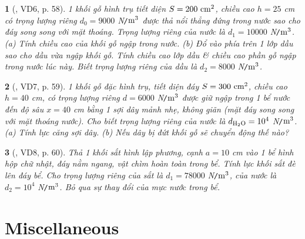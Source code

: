 \documentclass{article}
\newtheorem{baitoan}{}
\begin{document}
\begin{baitoan}[\cite{Van_Quyen_Hanh_Nhu_10_chuyen_Ly}, VD6, p. 58]
	1 khối gỗ hình trụ tiết diện $S = 200\ {\rm cm^2}$, chiều cao $h = 25$ {\rm cm} có trọng lượng riêng $d_0 = 9000$ {\rm N{\tt/}$\rm m^3$} được thả nổi thẳng đứng trong nước sao cho đáy song song với mặt thoáng. Trọng lượng riêng của nước là $d_1 = 10000$ {\rm N{\tt/}$\rm m^3$}. (a) Tính chiều cao của khối gỗ ngập trong nước. (b) Đổ vào phía trên 1 lớp dầu sao cho dầu vừa ngập khối gỗ. Tính chiều cao lớp dầu \& chiều cao phần gỗ ngập trong nước lúc này. Biết trọng lượng riêng của dầu là $d_2 = 8000$ {\rm N{\tt/}$\rm m^3$}.
\end{baitoan}

\begin{baitoan}[\cite{Van_Quyen_Hanh_Nhu_10_chuyen_Ly}, VD7, p. 59]
	1 khối gỗ đặc hình trụ, tiết diện đáy $S = 300\ {\rm cm^2}$, chiều cao $h = 40$ {\rm cm}, có trọng lượng riêng $d = 6000$ {\rm N{\tt/}$\rm m^3$} được giữ ngập trong 1 bể nước đến độ sâu $x = 40$ {\rm cm} bằng 1 sợi dây mảnh nhẹ, không giãn (mặt đáy song song với mặt thoáng nước). Cho biết trọng lượng riêng của nước là $d_{\rm H_2O} = 10^4$ {\rm N{\tt/}$\rm m^3$}. (a) Tính lực căng sợi dây. (b) Nếu dây bị đứt khối gỗ sẽ chuyển động thế nào?
\end{baitoan}

\begin{baitoan}[\cite{Van_Quyen_Hanh_Nhu_10_chuyen_Ly}, VD8, p. 60]
	Thả 1 khối sắt hình lập phương, cạnh $a = 10$ {\rm cm} vào 1 bể hình hộp chữ nhật, đáy nằm ngang, vật chìm hoàn toàn trong bể. Tính lực khối sắt đè lên đáy bể. Cho trọng lượng riêng của sắt là $d_1 = 78000$ {\rm N{\tt/}$\rm m^3$}, của nước là $d_2 = 10^4$ {\rm N{\tt/}$\rm m^3$}. Bỏ qua sự thay đổi của mực nước trong bể.
\end{baitoan}


\section{Miscellaneous}


\printbibliography[heading=bibintoc]
	
\end{document}
